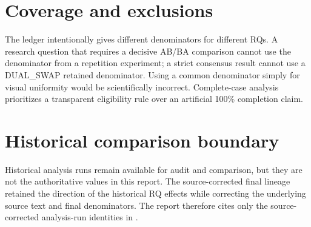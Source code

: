 \section{Coverage and exclusions}

The ledger intentionally gives different denominators for different RQs. A research question that requires a decisive AB/BA comparison cannot use the denominator from a repetition experiment; a strict consensus result cannot use a DUAL\_SWAP retained denominator. Using a common denominator simply for visual uniformity would be scientifically incorrect. Complete-case analysis prioritizes a transparent eligibility rule over an artificial 100\% completion claim.

\section{Historical comparison boundary}

Historical analysis runs remain available for audit and comparison, but they are not the authoritative values in this report. The source-corrected final lineage retained the direction of the historical RQ effects while correcting the underlying source text and final denominators. The report therefore cites only the source-corrected analysis-run identities in .
